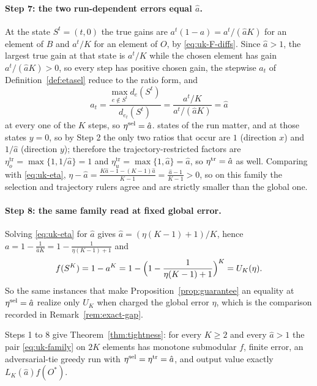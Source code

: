 \paragraph{Step 7: the two run-dependent errors equal $\hat a$.}
At the state $S^{t}=(t,0)$ the true gains are $a^{t}(1-a)=a^{t}/(\hat aK)$ for
an element of $B$ and $a^{t}/K$ for an element of $O$, by
\eqref{eq:uk-F-diffs}.  Since $\hat a>1$, the largest true gain at that state
is $a^{t}/K$ while the chosen element has gain $a^{t}/(\hat aK)>0$, so every
step has positive chosen gain, the stepwise $a_t$ of
Definition~\ref{def:etasel} reduce to the ratio form, and
\[
  a_t=\frac{\max_{e\notin S^{t}}d_e(S^{t})}{d_{e_t}(S^{t})}
  =\frac{a^{t}/K}{a^{t}/(\hat aK)}=\hat a
\]
at every one of the $K$ steps, so $\eta^{\mathrm{sel}}=\hat a$.
states of the run matter, and at those states $y=0$, so by Step 2 the only two
ratios that occur are $1$ (direction $x$) and $1/\hat a$ (direction $y$);
therefore the trajectory-restricted factors are
$\eta_o^{\mathrm{tr}}=\max\{1,1/\hat a\}=1$ and
$\eta_u^{\mathrm{tr}}=\max\{1,\hat a\}=\hat a$, so $\eta^{\mathrm{tr}}=\hat a$ as well.
Comparing with \eqref{eq:uk-eta},
$\eta-\hat a=\frac{K\hat a-1-(K-1)\hat a}{K-1}=\frac{\hat a-1}{K-1}>0$, so on
this family the selection and trajectory rulers agree and are strictly smaller
than the global one.

\paragraph{Step 8: the same family read at fixed global error.}
Solving \eqref{eq:uk-eta} for $\hat a$ gives $\hat a=(\eta(K-1)+1)/K$, hence
$a=1-\frac{1}{\hat aK}=1-\frac{1}{\eta(K-1)+1}$ and
\[
  f(S^{K})=1-a^{K}
  =1-\Bigl(1-\frac{1}{\eta(K-1)+1}\Bigr)^{K}=U_K(\eta).
\]
So the same instances that make Proposition~\ref{prop:guarantee} an equality at
$\eta^{\mathrm{sel}}=\hat a$ realize only $U_K$ when charged the global error $\eta$, which
is the comparison recorded in Remark~\ref{rem:exact-gap}.

Steps 1 to 8 give Theorem~\ref{thm:tightness}: for every $K\ge2$ and every
$\hat a>1$ the pair \eqref{eq:uk-family} on $2K$ elements has monotone
submodular $f$, finite error, an adversarial-tie greedy run with
$\eta^{\mathrm{sel}}=\eta^{\mathrm{tr}}=\hat a$, and output value exactly $L_K(\hat a)f(O^{\ast})$.

